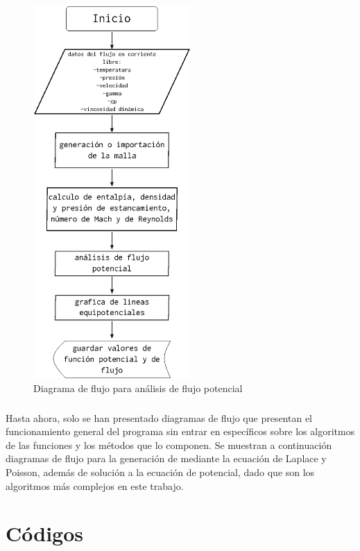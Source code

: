 \documentclass[letterpaper, openright, 12pt]{book}
\begin{document}
    \begin{figure}[htbp!]
        \centering
        \includegraphics[width=60mm]{./Imagenes/flujo_potencial}
        \caption{Diagrama de flujo para análisis de flujo potencial}
        \label{flujo_potencial}
    \end{figure}

    \paragraph*{}
        Hasta ahora, solo se han presentado diagramas de flujo que presentan el
        funcionamiento general del programa sin entrar en específicos sobre los
        algoritmos de las funciones y los métodos que lo componen. Se muestran a
        continuación diagramas de flujo para la generación de mediante la
        ecuación de Laplace y Poisson, además de solución a la ecuación de
        potencial, dado que son los algoritmos más complejos en este trabajo.

%
%
%
%
%

%
%
%
%
%
\appendix
\chapter{Códigos}\label{appCode}
%
%
%
%
%
\end{document}
